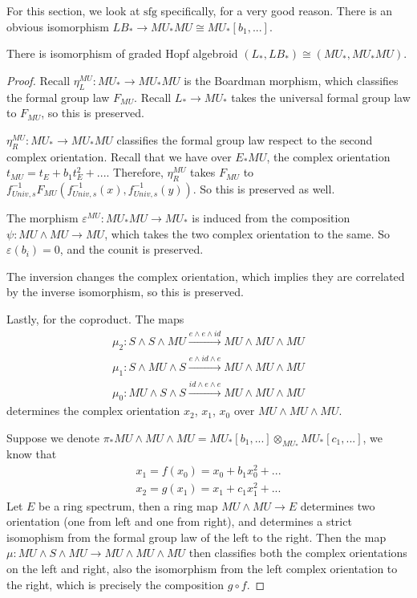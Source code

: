 For this section, we look at $\mathrm{sfg}$ specifically, for a very good reason. There is an obvious isomorphism $LB_*\to MU_*MU\cong MU_*[b_1,...]$. 
\begin{theorem}
    \cite{PreRavenelGreen} \cite{ChrLandweberCobordism} \cite{ChrNovikov1}

    There is isomorphism of graded Hopf algebroid $(L_*, LB_*)\cong (MU_*,MU_*MU)$.
\end{theorem}
\begin{proof}
    Recall $\eta_L^{MU}:MU_*\to MU_*MU$ is the Boardman morphism, which classifies the formal group law $F_{MU}$. Recall $L_*\to MU_*$ takes the universal formal group law to $F_{MU}$, so this is preserved. 

    $\eta_R^{MU}: MU_*\to MU_*MU$ classifies the formal group law respect to the second complex orientation. Recall that we have over $E_*MU$, the complex orientation $t_{MU}=t_E+b_1t_E^2+...$. Therefore, $\eta_R^{MU}$ takes $F_{MU}$ to $f_{Univ,s}^{-1}F_{MU}(f_{Univ,s}^{-1}(x),f_{Univ,s}^{-1}(y))$. So this is preserved as well.

    The morphism $\varepsilon^{MU}:MU_*MU\to MU_*$ is induced from the composition $\psi:MU\wedge MU \to MU$, which takes the two complex orientation to the same. So $\varepsilon(b_i)=0$, and the counit is preserved.

    The inversion changes the complex orientation, which implies they are correlated by the inverse isomorphism, so this is preserved.

    Lastly, for the coproduct. The maps
    \begin{align*}
          \mu_{2}:S\wedge S\wedge MU\xrightarrow{e\wedge e\wedge id} MU\wedge MU \wedge MU
        \\ \mu_1:S\wedge MU\wedge S\xrightarrow{e\wedge id\wedge e} MU\wedge MU \wedge MU
        \\ \mu_0:MU\wedge S\wedge S\xrightarrow{id\wedge e\wedge e} MU\wedge MU \wedge MU
    \end{align*}determines the complex orientation $x_2$, $x_1$, $x_0$ over $MU\wedge MU\wedge MU$. 

    Suppose we denote $\pi_*MU\wedge MU\wedge MU=MU_*[b_1,...]\otimes_{MU_*}MU_*[c_1,...]$, we know that 
    \begin{align*}
        x_1=f(x_0)=x_0+b_1x_0^2+...
        \\ x_2=g(x_1)=x_1 +c_1x_1^2+...
    \end{align*}
    Let $E$ be a ring spectrum, then a ring map $MU\wedge MU \to E$ determines two orientation (one from left and one from right), and determines a strict isomophism from the formal group law of the left to the right.
    Then the map $\mu:MU\wedge S\wedge MU\to MU\wedge MU\wedge MU$ then classifies both the complex orientations on the left and right, also the isomorphism from the left complex orientation to the right, which is precisely the composition $g\circ f$. 
\end{proof}

